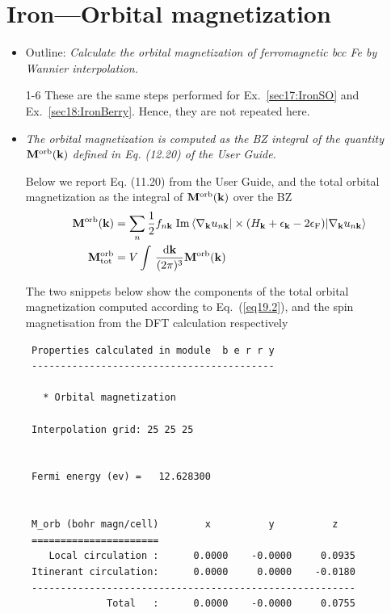 \section{Iron---Orbital magnetization}
\label{sec19:IronOM}

\begin{itemize}
	\item Outline: {\it Calculate the orbital magnetization of ferromagnetic bcc Fe by Wannier interpolation.}
\end{itemize}

\begin{itemize}
	\item[1-6] These are the same steps performed for Ex.~\ref{sec17:IronSO} and Ex.~\ref{sec18:IronBerry}. Hence, they are not repeated here.

	\item {\it The orbital magnetization is computed as the BZ integral of the quantity $\mathbf{M}^{\mathrm{orb}}(\bfk)$ defined in Eq. (12.20)
of the User Guide.}

Below we report Eq. (11.20) from the User Guide, and the total orbital magnetization as the integral of $\mathbf{M}^{\mathrm{orb}}(\bfk)$ over the BZ
\begin{align}
\mathbf{M}^{\mathrm{orb}}(\bfk) & = \sum_{n}\frac{1}{2}f_{n\bfk}\;\mathrm{Im} \braket{\nabla_{\bfk}\unk \vert \times (H_\bfk + \epsilon_\bfk - 2\epsilon_{\mathrm{F}}) \vert \nabla_\bfk \unk}
\label{eq19.1} \\
\mathbf{M}^{\mathrm{orb}}_{\mathrm{tot}} & = V\int\,\frac{\diffk}{(2\pi)^3} \mathbf{M}^{\mathrm{orb}}(\bfk)
\label{eq19.2}
\end{align}

The two snippets below show the components of the total orbital magnetization computed according to Eq.~(\ref{eq19.2}), and the spin magnetisation from the DFT calculation respectively
{\small
\begin{tcolorbox}[title=From Fe.wpout,sharp corners,boxrule=0.5pt]
\begin{verbatim}
 Properties calculated in module  b e r r y
 ------------------------------------------

   * Orbital magnetization

 Interpolation grid: 25 25 25


 Fermi energy (ev) =   12.628300


 M_orb (bohr magn/cell)        x          y          z
 ======================
    Local circulation :      0.0000    -0.0000     0.0935
 Itinerant circulation:      0.0000     0.0000    -0.0180
 --------------------------------------------------------
              Total   :      0.0000    -0.0000     0.0755


\end{verbatim}
\end{tcolorbox}}
\end{itemize}
